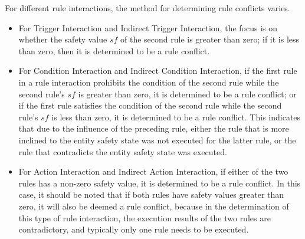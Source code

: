 For different rule interactions, the method for determining rule conflicts varies. 
\begin{itemize}
	\item For Trigger Interaction and Indirect Trigger Interaction, the focus is on whether the safety value $sf$ of the second rule is greater than zero; if it is less than zero, then it is determined to be a rule conflict.
	\item For Condition Interaction and Indirect Condition Interaction, if the first rule in a rule interaction prohibits the condition of the second rule while the second rule’s $sf$ is greater than zero, it is determined to be a rule conflict; or if the first rule satisfies the condition of the second rule while the second rule’s $sf$ is less than zero, it is determined to be a rule conflict. This indicates that due to the influence of the preceding rule, either the rule that is more inclined to the entity safety state was not executed for the latter rule, or the rule that contradicts the entity safety state was executed.
	\item For Action Interaction and Indirect Action Interaction, if either of the two rules has a non-zero safety value, it is determined to be a rule conflict. In this case, it should be noted that if both rules have safety values greater than zero, it will also be deemed a rule conflict, because in the determination of this type of rule interaction, the execution results of the two rules are contradictory, and typically only one rule needs to be executed.
\end{itemize}

